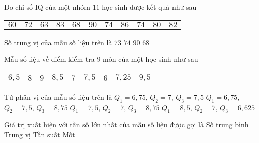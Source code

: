\begin{ex}%
	Đo chỉ số IQ của một nhóm $11$ học sinh được kết quả như sau
	\begin{center}
		\begin{tabular}{ccccccccccc}
			$60$& $72$ & $63$ & $83$ & $68$ & $90$ & $74$ & $86$ & $74$ & $80$ & $82$
		\end{tabular}
	\end{center}
	Số trung vị của mẫu số liệu trên là
	\choice
	{$73$}
	{\True $74$}
	{$90$}
	{$68$}
\end{ex}
\begin{ex}%
	Mẫu số liệu về điểm kiểm tra $9$ môn của một học sinh như sau
	\begin{center}
		\begin{tabular}{ccccccccc}
			$6{,}5$ & $8$ & $9$ & $8{,}5$ & $7$ & $7{,}5$ & $6$ & $7{,}25$ & $9{,}5$
		\end{tabular}
	\end{center}
	Tứ phân vị của mẫu số liệu trên là
	\choice
	{$Q_1=6{,}75$, $Q_2=7$, $Q_3=7{,}5$}
	{\True $Q_1=6{,}75$, $Q_2=7{,}5$, $Q_3=8{,}75$}
	{$Q_1=7{,}5$, $Q_2=7$, $Q_3=8{,}75$}
	{$Q_1=8{,}5$, $Q_2=7$, $Q_3=6{,}625$}
\end{ex}
\begin{ex}%
	Giá trị xuất hiện với tần số lớn nhất của mẫu số liệu được gọi là
	\choice
	{Số trung bình}
	{Trung vị}
	{Tần suất}
	{\True Mốt}
\end{ex}
